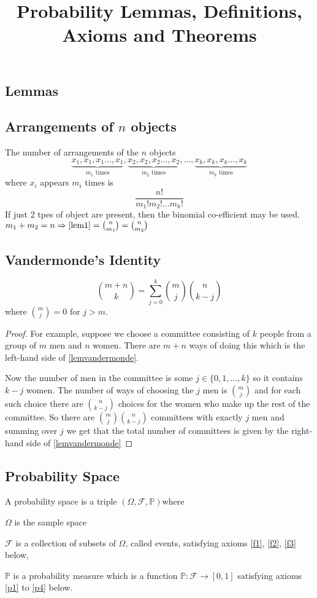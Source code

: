 \documentclass[fontsize=10pt]{article}
\title{Probability Lemmas, Definitions, Axioms and Theorems}
\author{}
\date{}
\numberwithin{equation}{subsection}
\newcommand{\FF}{\mathcal{F}}
\begin{document}
\maketitle
\tableofcontents\newpage
\begin{multicols}{2}
\section{Lemmas}
\subsection{Arrangements of $n$ objects}
The number of arrangements of the $n$ objects \[\underbrace{x_1,x_1,x_1\ldots ,x_1}_\text{$m_1$ times},\underbrace{x_2,x_2,x_2\ldots ,x_2}_\text{$m_2$ times},\ldots,\underbrace{x_k,x_k,x_k\ldots,x_k}_\text{$m_k$ times}\] where $x_i$ appears $m_i$ times is 
\begin{equation}\label{lem1}
\frac{n!}{m_1!m_2!\ldots m_k!}
\end{equation}
If just 2 tpes of object are present, then the binomial co-efficient may be used.  $m_1+m_2=n\Rightarrow\eqref{lem1}=\binom{n}{m_1}=\binom{n}{m_2}$
\subsection{Vandermonde's Identity}
\begin{equation}\label{lemvandermonde}
\binom{m+n}{k}=\sum^k_{j=0}\binom{m}{j}\binom{n}{k-j}
\end{equation}
where $\binom{m}{j}=0\text{ for }j>m$.

\begin{proof} For example, suppose we choose a committee consisting of $k$ people from a group of $m$ men and $n$ women.
There are $m+n$ ways of doing this which is the left-hand side of \eqref{lemvandermonde}.

Now the number of men in the committee is some $j\in\{0,1,\ldots,k\}$ so it contains $k-j$ women.  The number of ways of choosing the $j$ men is $\binom{m}{j}$ and for each such choice there are $\binom{n}{k-j}$ choices for the women who make up the rest of the committee. So there are $\binom{m}{j}\binom{n}{k-j}$ committees with exactly $j$ men and summing over $j$ we get that the total number of committees is given by the right-hand side of \eqref{lemvandermonde}
\end{proof}
\subsection{Probability Space}
A probability space is a triple $(\Omega,\FF,\mathbb{P})$where
\begin{itemize*}
\item $\Omega$ is the sample space
\item $\FF$ is a collection of subsets of $\Omega$, called events, satisfying axioms \ref{f1}, \ref{f2}, \ref{f3} below,
\item $\mathbb{P}$ is a probability measure which is a function $\mathbb{P}:\FF\to\left[0,1\right]$ satisfying axioms \ref{p1} to \ref{p4} below.
\end{itemize*}

\end{multicols}
\end{document}
